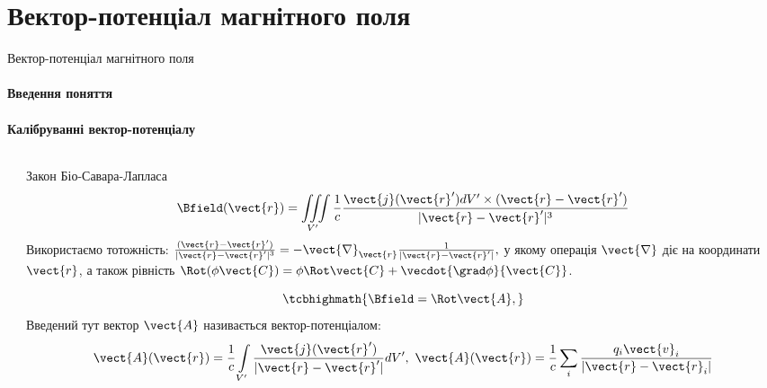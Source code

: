 \documentclass{beamer}
\begin{document}
\section{Вектор-потенціал магнітного поля}


\begin{frame}[t]{Вектор-потенціал магнітного поля}{}
	\framesubtitle<1>{Введення поняття}
	\framesubtitle<2>{Калібруванні вектор-потенціалу}
	\begin{columns}
		\begin{column}{0.3\linewidth}\centering
            
		\end{column}
		\begin{column}{0.7\linewidth}
			\begin{overprint}
				\begin{block}{}
					Закон Біо-Савара-Лапласа
					\begin{equation*}
						\Bfield(\vect{r}) = \iiint\limits_{V'} \frac1c \frac{ \vect{j}(\vect{r}')dV'\times(\vect{r} - \vect{r}') }{|\vect{r} -
							\vect{r}'|^3}
					\end{equation*}
					{\scriptsize
					Використаємо тотожність:
					\(
					\frac{ (\vect{r} - \vect{r}') }{|\vect{r} - \vect{r}'|^3} = - \vect{\nabla}_{\vect{r}} \frac{ 1 }{|\vect{r} - \vect{r}'|},
					\)
					у якому операція $\vect{\nabla}$ діє на координати $\vect{r}$, а також рівність
					$\Rot(\phi\vect{C}) = \phi\Rot\vect{C} + \vecdot{\grad\phi}{\vect{C}} $.}
				\end{block}
				\onslide<2>
				\begin{block}{}
					\begin{equation*}
						\tcbhighmath{\Bfield = \Rot\vect{A},}
					\end{equation*}
					Введений тут вектор $\vect{A}$ називається \alert{вектор-потенціалом}:
					\begin{equation*}
						\vect{A}(\vect{r}) = \frac1c \int\limits_{V'} \frac{\vect{j}(\vect{r}')}{|\vect{r} - \vect{r}'|} dV',
						\
						\vect{A}(\vect{r}) = \frac1c \sum\limits_i \frac{q_i\vect{v}_i}{|\vect{r} - \vect{r}_i|}
					\end{equation*}
				\end{block}
			\end{overprint}
		\end{column}

\end{columns}
\end{frame}
\end{document}

